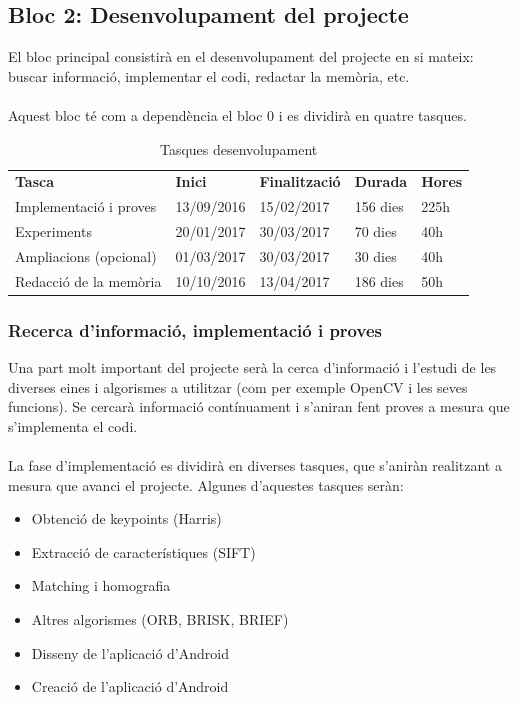 	\subsection{Bloc 2: Desenvolupament del projecte}
			El bloc principal consistirà en el desenvolupament del projecte en si mateix: buscar informació, implementar el codi, redactar la memòria, etc.\\\\
			Aquest bloc té com a dependència el bloc 0 i es dividirà en quatre tasques.\\
			\begin{table}[H]
				\begin{center}
					\begin{tabular}{p{5cm} !{\vrule width -1pt}x{2.1cm} !{\vrule width -1pt}x{2.4cm} !{\vrule width -1pt}x{1.6cm} !{\vrule width -1pt}x{1.6cm}}
						\textbf{Tasca} & \textbf{Inici} & \textbf{Finalització} & \textbf{Durada} & \textbf{Hores} \\ %
						Implementació i proves & 13/09/2016 & 15/02/2017 & 156 dies & 225h \\
						Experiments & 20/01/2017 & 30/03/2017 & 70 dies & 40h \\
						Ampliacions (opcional) & 01/03/2017 & 30/03/2017 & 30 dies & 40h \\
						Redacció de la memòria & 10/10/2016 & 13/04/2017 & 186 dies & 50h \\
					\end{tabular}
				\end{center}
				\caption{Tasques desenvolupament}
			\end{table}

		\subsubsection{Recerca d'informació, implementació i proves}
			Una part molt important del projecte serà la cerca d'informació i l'estudi de les diverses eines i algorismes a utilitzar (com per exemple OpenCV i les seves funcions).
			Se cercarà informació contínuament i s'aniran fent proves a mesura que s'implementa el codi.\\\\
			La fase d'implementació es dividirà en diverses tasques, que s'aniràn realitzant a mesura que avanci el projecte. Algunes d'aquestes tasques seràn:
			\begin{itemize}
				\item{Obtenció de keypoints (Harris)}
				\item{Extracció de característiques (SIFT)}
				\item{Matching i homografia}
				\item{Altres algorismes (ORB, BRISK, BRIEF)}
				\item{Disseny de l'aplicació d'Android}
				\item{Creació de l'aplicació d'Android}
			\end{itemize}
